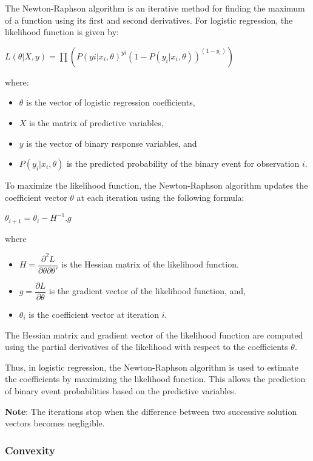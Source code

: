 \documentclass{article}
\providecommand{\tightlist}{%
  \setlength{\itemsep}{0pt}\setlength{\parskip}{0pt}}
\begin{document}
The Newton-Raphson algorithm is an iterative method for finding the
maximum of a function using its first and second derivatives. For
logistic regression, the likelihood function is given by:

\(L(\theta | X, y) = \prod(P(yi | x_i, \theta)^{yi} (1 - P(y_i | x_i, \theta))^{(1 - y_i)})\)

where:

\begin{itemize}
\tightlist
\item
  \(\theta\) is the vector of logistic regression coefficients,
\item
  \(X\) is the matrix of predictive variables,
\item
  \(y\) is the vector of binary response variables, and
\item
  \(P(y_i | x_i, \theta)\) is the predicted probability of the binary
  event for observation \(i\).
\end{itemize}

To maximize the likelihood function, the Newton-Raphson algorithm
updates the coefficient vector \(\theta\) at each iteration using the
following formula:

\(\theta_{i+1} = \theta_i - H^{-1} . g\)

where

\begin{itemize}
\item
  \(H = \dfrac{\partial^2L}{\partial \theta \partial\theta'}\) is the
  Hessian matrix of the likelihood function.
\item
  \(g = \dfrac{\partial L}{\partial \theta }\) is the gradient vector of
  the likelihood function, and,
\item
  \(\theta_i\) is the coefficient vector at iteration \(i\).
\end{itemize}

The Hessian matrix and gradient vector of the likelihood function are
computed using the partial derivatives of the likelihood with respect to
the coefficients \(\theta\).

Thus, in logistic regression, the Newton-Raphson algorithm is used to
estimate the coefficients by maximizing the likelihood function. This
allows the prediction of binary event probabilities based on the
predictive variables.

\textbf{Note}: The iterations stop when the difference between two
successive solution vectors becomes negligible.

\subsubsection{Convexity}\label{convexity}
\end{document}
